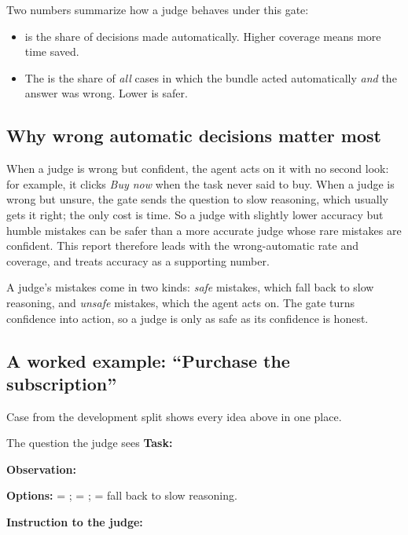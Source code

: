 Two numbers summarize how a judge behaves under this gate:
\begin{itemize}
  \item {} is the share of decisions made automatically. Higher coverage means more time
    saved.
  \item The  is the share of \emph{all} cases in which the bundle acted
    automatically \emph{and} the answer was wrong. Lower is safer.
\end{itemize}

\subsection{Why wrong automatic decisions matter most}

When a judge is wrong but confident, the agent acts on it with no second look: for example, it clicks
\emph{Buy now} when the task never said to buy. When a judge is wrong but unsure, the gate sends the
question to slow reasoning, which usually gets it right; the only cost is time. So a judge with slightly
lower accuracy but humble mistakes can be safer than a more accurate judge whose rare mistakes are
confident. This report therefore leads with the wrong-automatic rate and coverage, and treats accuracy as
a supporting number.

\begin{keyidea}
A judge's mistakes come in two kinds: \emph{safe} mistakes, which fall back to slow reasoning, and
\emph{unsafe} mistakes, which the agent acts on. The gate turns confidence into action, so a judge is
only as safe as its confidence is honest.
\end{keyidea}

\subsection{A worked example: ``Purchase the subscription''}\label{sec:worked}

Case  from the development split shows every idea above in one place.

\begin{casecard}{The question the judge sees}
\textbf{Task:} \ExTask\par
\textbf{Observation:} \ExObs\par
\textbf{Options:}  = \ExOptA;  = \ExOptB;  = fall back to slow reasoning.\par
\textbf{Instruction to the judge:} \emph{\ExInstr}
\end{casecard}

